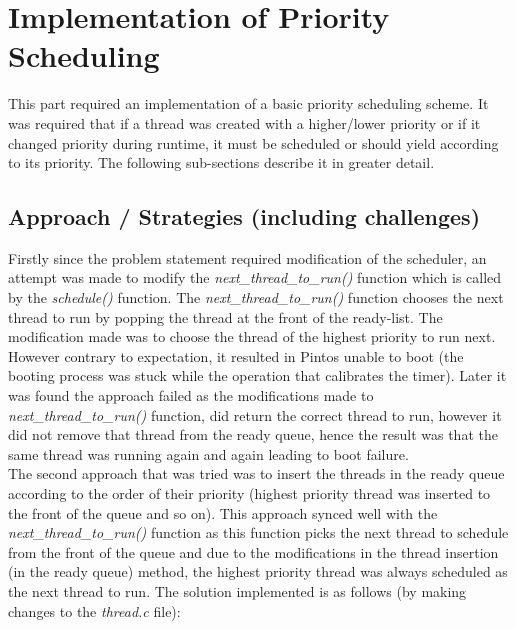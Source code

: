\documentclass[]{article}
\begin{document}
\section{Implementation of Priority Scheduling}
	This part required an implementation of a basic priority scheduling scheme. It was required that if a thread was created with a higher/lower priority or if it changed priority during runtime, it must be scheduled or should yield according to its priority. The following sub-sections describe it in greater detail.
	\subsection{Approach / Strategies (including challenges)}
		Firstly since the problem statement required modification of the scheduler, an attempt was made to modify the \textit{next\_thread\_to\_run()} function which is called by the \textit{schedule()} function. The \textit{next\_thread\_to\_run()} function chooses the next thread to run by popping the thread at the front of the ready-list. The modification made was to choose the thread of the highest priority to run next. However contrary to expectation, it resulted in Pintos unable to boot (the booting process was stuck while the operation that calibrates the timer).  Later it was found the approach failed as the modifications made to \textit{next\_thread\_to\_run()} function, did return the correct thread to run, however it did not remove that thread from the ready queue, hence the result was that the same thread was running again and again leading to boot failure.\\
		The second approach that was tried was to insert the threads in the ready queue according to the order of their priority (highest priority thread was inserted to the front of the queue and so on). This approach synced well with the \textit{next\_thread\_to\_run()} function as this function picks the next thread to schedule from the front of the queue and due to the modifications in the thread insertion (in the ready queue) method, the highest priority thread was always scheduled as the next thread to run. The solution implemented is as follows (by making changes to the \textit{thread.c} file):
\end{document}
